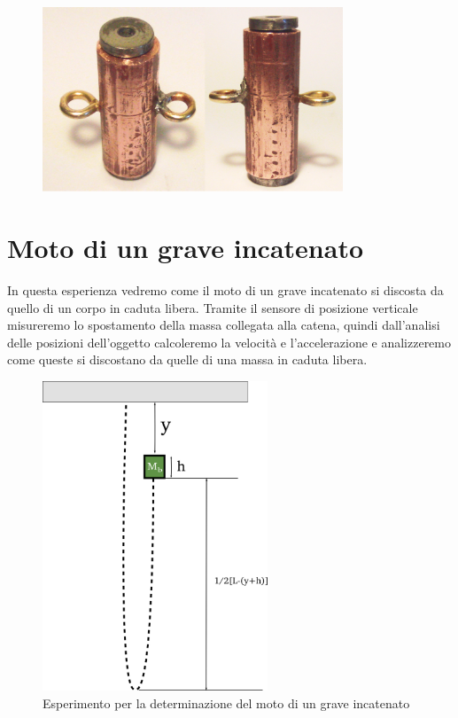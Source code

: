 \documentclass[a4paper,10pt,oneside]{article}
\begin{document}
\begin{figure}[H]
 \centering
 \includegraphics[width=0.8\textwidth]{./Immagini/sonda.png}
 \label{fig:sonda_verticale}
\end{figure}




\section*{Moto di un grave incatenato}

In questa esperienza vedremo come il moto di un grave incatenato si discosta da quello di un corpo in caduta libera. Tramite il sensore di posizione verticale misureremo lo spostamento della massa collegata alla catena, quindi dall'analisi delle posizioni dell'oggetto calcoleremo la velocità e l'accelerazione e analizzeremo come queste si discostano da quelle di una massa in caduta libera.
\begin{figure}[H]
 \centering
 \includegraphics[width=0.6\textwidth]{./Immagini/bungiie.png}
 \caption{Esperimento per la determinazione del moto di un grave incatenato}
 \label{fig:moto_incatenato}
\end{figure}
\end{document}
